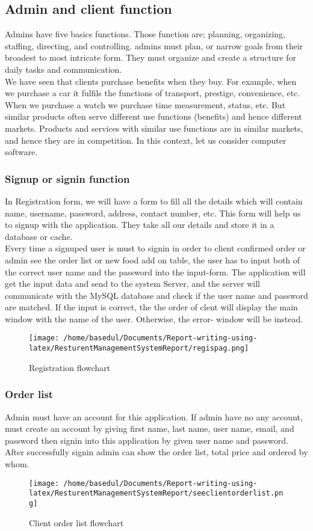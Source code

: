 \documentclass[12pt,a4paper]{article}
\newcommand\tab[1][.7cm]{\hspace*{#1}}
\begin{document}
	\subsection{Admin and client function}
	\tab Admins have five basics functions. Those function are; planning, organizing, staffing, directing, and controlling. admins must plan, or narrow goals from their broadest to most intricate form. They must organize and create a structure for daily tasks and communication.\\
We have seen that clients purchase benefits when they buy. For example, when we purchase a car it fulfils the functions of transport, prestige, convenience, etc. When we purchase a watch we purchase time measurement, status, etc. But similar products often serve different use functions (benefits) and hence different markets. Products and services with similar use functions are in similar markets, and hence they are in competition. In this context, let us consider computer software.
	\subsubsection{Signup or signin function}
	\tab In Registration form, we will have a form to fill all the details which will contain name, username, password, address, contact number, etc. This form will help us to signup with the application. They take all our details and store it in a database or cache.
\\Every time a signuped user is must to signin in order to client confirmed order or admin see the order list or new food add on table, the
user has to input both of the correct user name and the password into the input-form. The
application will get the input data and send to the system Server, and the server will
communicate with the MySQL database and check if the user name and password are	matched. If the input is correct, the the order of clent will display the main window with the
name of the user. Otherwise, the error-
window will be instead.
		\begin{figure}[H]
		\centering
		\texttt{[image: /home/basedul/Documents/Report-writing-using-latex/ResturentManagementSystemReport/regispag.png]}
		\caption{\hspace{0.35em}Registration flowchart}
		\label{fig:regiflow} 
		\end{figure}
	\subsubsection{Order list}
		\tab Admin must have an account for this application. If admin have no any account, must create an account by giving first name, last name, user name, email, and password then signin into this application by given user name and password. After successfully signin admin can show the order list, total price and ordered by whom.
		\begin{figure}[H]
		\centering
		\texttt{[image: /home/basedul/Documents/Report-writing-using-latex/ResturentManagementSystemReport/seeclientorderlist.png]}
		\caption{\hspace{0.35em}Client order list flowchart}
		\label{fig:seeclientorderlist} 
		\end{figure}
	
\end{document}
